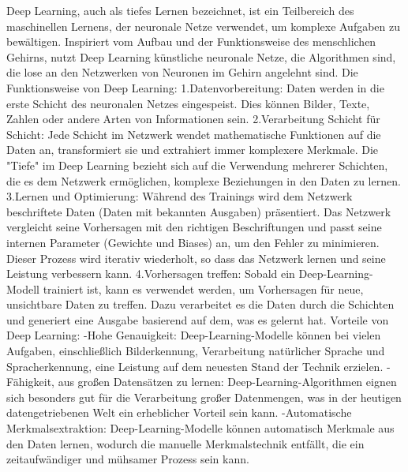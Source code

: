 \documentclass{article}
\begin{document}
{    Deep Learning, auch als tiefes Lernen bezeichnet, ist ein Teilbereich des maschinellen Lernens, der neuronale Netze verwendet, um komplexe Aufgaben zu bewältigen. Inspiriert vom Aufbau und der Funktionsweise des menschlichen Gehirns, nutzt Deep Learning künstliche neuronale Netze, die Algorithmen sind, die lose an den Netzwerken von Neuronen im Gehirn angelehnt sind.
    Die Funktionsweise von Deep Learning:
    1.Datenvorbereitung: Daten werden in die erste Schicht des neuronalen Netzes eingespeist. Dies können Bilder, Texte, Zahlen oder andere Arten von Informationen sein.
    2.Verarbeitung Schicht für Schicht: Jede Schicht im Netzwerk wendet mathematische Funktionen auf die Daten an, transformiert sie und extrahiert immer komplexere Merkmale. Die "Tiefe" im Deep Learning bezieht sich auf die Verwendung mehrerer Schichten, die es dem Netzwerk ermöglichen, komplexe Beziehungen in den Daten zu lernen.
    3.Lernen und Optimierung: Während des Trainings wird dem Netzwerk beschriftete Daten (Daten mit bekannten Ausgaben) präsentiert. Das Netzwerk vergleicht seine Vorhersagen mit den richtigen Beschriftungen und passt seine internen Parameter (Gewichte und Biases) an, um den Fehler zu minimieren. Dieser Prozess wird iterativ wiederholt, so dass das Netzwerk lernen und seine Leistung verbessern kann.
    4.Vorhersagen treffen: Sobald ein Deep-Learning-Modell trainiert ist, kann es verwendet werden, um Vorhersagen für neue, unsichtbare Daten zu treffen. Dazu verarbeitet es die Daten durch die Schichten und generiert eine Ausgabe basierend auf dem, was es gelernt hat.
    Vorteile von Deep Learning:
    -Hohe Genauigkeit: Deep-Learning-Modelle können bei vielen Aufgaben, einschließlich Bilderkennung, Verarbeitung natürlicher Sprache und Spracherkennung, eine Leistung auf dem neuesten Stand der Technik erzielen.
    -Fähigkeit, aus großen Datensätzen zu lernen: Deep-Learning-Algorithmen eignen sich besonders gut für die Verarbeitung großer Datenmengen, was in der heutigen datengetriebenen Welt ein erheblicher Vorteil sein kann.
    -Automatische Merkmalsextraktion: Deep-Learning-Modelle können automatisch Merkmale aus den Daten lernen, wodurch die manuelle Merkmalstechnik entfällt, die ein zeitaufwändiger und mühsamer Prozess sein kann.
    
}
\end{document}
